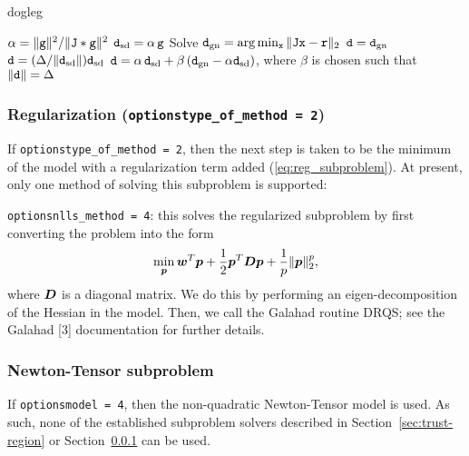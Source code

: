 \begin{algorithm}
\caption{dogleg}
\label{alg:dogleg}
  \begin{algorithmic}[1]
     
        \State $\alpha = \|{\tt g}\|^2 / \|{\tt J} * {\tt g}\|^2$
        \State ${\tt d}_{\rm sd} = \alpha \,{\tt g}$
        \State Solve ${\tt d}_{\rm gn} = \arg \min_{{\tt x}}\|{\tt J} {\tt x}- {\tt r}\|_2$
        \State ${\tt d} = {\tt d}_{\rm gn}$
        \State ${\tt d} = (\Delta / \|{\tt d}_{\rm sd}\|) {\tt d}_{\rm sd}$
        \Else
        \State ${\tt d} = \alpha \, {\tt d}_{\rm sd} + \beta\, ({\tt d}_{\rm gn} - \alpha {\tt d}_{\rm sd})$, where $\beta$ is chosen such that $\|{\tt d}\| = \Delta$
        \EndIf
  \end{algorithmic}
\end{algorithm}
 
\subsubsection{Regularization ({\tt options\ct type\_of\_method = 2})}
\label{sec:regularization}

If {\tt options\ct type\_of\_method = 2}, then the next step is taken to be the minimum
of the model with a regularization term added (\ref{eq:reg_subproblem}).  At present, 
only one method of solving this subproblem is supported:

\begin{description}
\item {\tt options\ct nlls\_method = 4}: this solves the regularized subproblem by first 
converting the problem into the form
$$\min_{\bm p} {\bm w}^T {\bm p} + \frac{1}{2} {\bm p}^T {\bm D} {\bm p} + \frac{1}{p}\|{\bm p}\|_2^p,$$
where ${\bm D}$ is a diagonal matrix.  We do this by performing an eigen-decomposition of 
the Hessian in the model.  Then, we call the {\sc Galahad} routine {\sc DRQS}; see 
the {\sc Galahad} [3] documentation for further details.
\end{description}

\subsubsection{Newton-Tensor subproblem}
\label{sec:newton_tensor_subproblem}

If {\tt options\ct model = 4}, then the non-quadratic Newton-Tensor model is used.  As such, none of the established subproblem solvers described in Section~\ref{sec:trust-region} or Section~\ref{sec:regularization} can be used.

